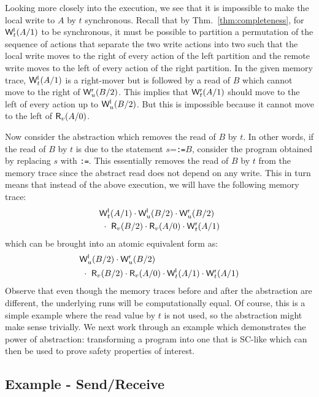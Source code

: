 Looking more closely into the execution, we see that it is impossible to make the local write to $A$ by $t$ synchronous. 
Recall that by Thm.~\ref{thm:completeness}, for $\mathsf{W}^{\mathsf{l}}_{t}(A/1)$ to be synchronous, it must be possible to partition a permutation of the sequence of actions that separate the two write actions into two such that the local write moves to the right of every action of the left partition and the remote write moves to the left of every action of the right partition.
In the given memory trace, $\mathsf{W}^{\mathsf{l}}_{t}(A/1)$ is a right-mover but is followed by a read of $B$ which cannot move to the right of $\mathsf{W}^{\mathsf{r}}_{u}(B/2)$.
This implies that $\mathsf{W}^{\mathsf{r}}_{t}(A/1)$ should move to the left of every action up to $\mathsf{W}^{\mathsf{l}}_{u}(B/2)$.
But this is impossible because it cannot move to the left of $\mathsf{R}_{v}(A/0)$.

Now consider the abstraction which removes the read of $B$ by $t$.
In other words, if the read of $B$ by $t$ is due to the statement $s$={\tt {}:=$B$}, consider the program obtained by replacing $s$ with {\tt {}:=\alihavocval}.
This essentially removes the read of $B$ by $t$ from the memory trace since the abstract read does not depend on any write.
This in turn means that instead of the above execution, we will have the following memory trace:
{\small
\begin{eqnarray*}
&\mathsf{W}^{\mathsf{l}}_{t}(A/1) \cdot \mathsf{W}^{\mathsf{l}}_{u}(B/2) \cdot \mathsf{W}^{\mathsf{r}}_{u}(B/2)\\
&\ \cdot\ \mathsf{R}_{v}(B/2) \cdot \mathsf{R}_{v}(A/0) \cdot \mathsf{W}^{\mathsf{r}}_{t}(A/1)
\end{eqnarray*}
}
which can be brought into an atomic equivalent form as:
{\small
\begin{eqnarray*}
&\mathsf{W}^{\mathsf{l}}_{u}(B/2) \cdot \mathsf{W}^{\mathsf{r}}_{u}(B/2)\\
&\ \cdot\ \mathsf{R}_{v}(B/2) \cdot \mathsf{R}_{v}(A/0) \cdot \mathsf{W}^{\mathsf{l}}_{t}(A/1) \cdot \mathsf{W}^{\mathsf{r}}_{t}(A/1)
\end{eqnarray*}
}
Observe that even though the memory traces before and after the abstraction are different, the underlying runs will be computationally equal.
Of course, this is a simple example where the read value by $t$ is not used, so the abstraction might make sense trivially. 
We next work through an example which demonstrates the power of abstraction: transforming a program into one that is SC-like which can then be used to prove safety properties of interest.
 
\subsection{Example - Send/Receive}
\label{subsec:send-receive}

